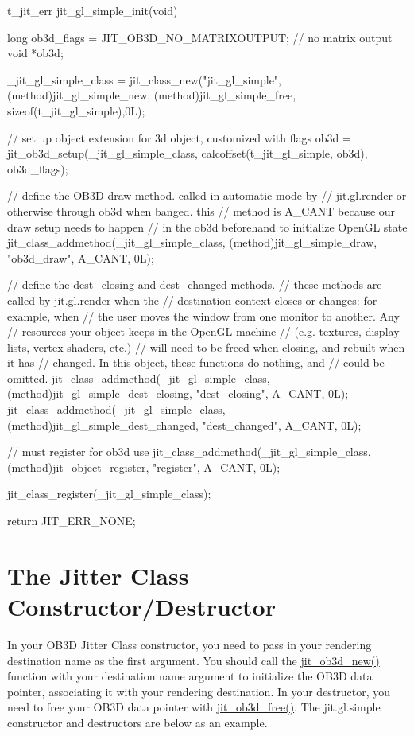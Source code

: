 \begin{DoxyCode}
t_jit_err jit_gl_simple_init(void) 
{
   long ob3d_flags = JIT_OB3D_NO_MATRIXOUTPUT; // no matrix output
   void *ob3d;
   
   _jit_gl_simple_class = jit_class_new("jit_gl_simple", 
      (method)jit_gl_simple_new, (method)jit_gl_simple_free,
      sizeof(t_jit_gl_simple),0L);
   
   // set up object extension for 3d object, customized with flags
   ob3d = jit_ob3d_setup(_jit_gl_simple_class, 
            calcoffset(t_jit_gl_simple, ob3d), 
            ob3d_flags);
   
   // define the OB3D draw method.  called in automatic mode by 
   // jit.gl.render or otherwise through ob3d when banged. this 
   // method is A_CANT because our draw setup needs to happen 
   // in the ob3d beforehand to initialize OpenGL state 
   jit_class_addmethod(_jit_gl_simple_class, 
      (method)jit_gl_simple_draw, "ob3d_draw", A_CANT, 0L);
   
   // define the dest_closing and dest_changed methods. 
   // these methods are called by jit.gl.render when the 
   // destination context closes or changes: for example, when 
   // the user moves the window from one monitor to another. Any 
   // resources your object keeps in the OpenGL machine 
   // (e.g. textures, display lists, vertex shaders, etc.) 
   // will need to be freed when closing, and rebuilt when it has 
   // changed. In this object, these functions do nothing, and 
   // could be omitted.
   jit_class_addmethod(_jit_gl_simple_class, 
      (method)jit_gl_simple_dest_closing, "dest_closing", A_CANT, 0L);
   jit_class_addmethod(_jit_gl_simple_class, 
      (method)jit_gl_simple_dest_changed, "dest_changed", A_CANT, 0L);
   
   // must register for ob3d use
   jit_class_addmethod(_jit_gl_simple_class, 
      (method)jit_object_register, "register", A_CANT, 0L);

   jit_class_register(_jit_gl_simple_class);

   return JIT_ERR_NONE;
}
\end{DoxyCode}
\hypertarget{chapter_jit_ob3dqs_chapter_jit_ob3dqs_ctordtor}{}\section{The Jitter Class Constructor/Destructor}\label{chapter_jit_ob3dqs_chapter_jit_ob3dqs_ctordtor}
In your OB3D Jitter Class constructor, you need to pass in your rendering destination name as the first argument. You should call the \hyperlink{group__ob3dmod_gac27d63b4d66faf27fda165792dafa223}{jit\_\-ob3d\_\-new()} function with your destination name argument to initialize the OB3D data pointer, associating it with your rendering destination. In your destructor, you need to free your OB3D data pointer with \hyperlink{group__ob3dmod_ga5c1537df19c2d7e12ef809d3de3943d9}{jit\_\-ob3d\_\-free()}. The jit.gl.simple constructor and destructors are below as an example.


